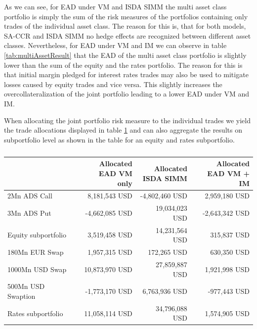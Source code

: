 \documentclass[../Thesis_AHoecherl.tex]{subfiles}
\begin{document}
    As we can see, for EAD under VM and ISDA SIMM the multi asset class portfolio is simply the sum of the risk measures of the portfolios containing only trades of the individual asset class.
    The reason for this is, that for both models, SA-CCR and ISDA SIMM no hedge effects are recognized between different asset classes.
    Nevertheless, for EAD under VM and IM we can observe in table \ref{tab:multiAssetResult} that the EAD of the multi asset class portfolio is slightly lower than the sum of the equity and the rates portfolio. 
    The reason for this is that initial margin pledged for interest rates trades may also be used to mitigate losses caused by equity trades and vice versa. This slightly increases the overcollateralization of the joint portfolio leading to a lower EAD under VM and IM.

    When allocating the joint portfolio risk measure to the individual trades we yield the trade allocations displayed in table \ref{tab:multiAssetAllocation} and can also aggregate the results on subportfolio level as shown in the table for an equity and rates subportfolio.

    \begin{table}[htbp]
        \centering
        \begin{tabular}{l||r|r|r}
                & \makecell{Allocated \\ EAD VM only} &\makecell{Allocated \\ ISDA SIMM} & \makecell{Allocated \\EAD VM + IM} \\
                \toprule
        2Mn ADS Call & 8,181,543 USD & -4,802,460 USD & 2,959,180 USD \\
        3Mn ADS Put & -4,662,085 USD & 19,034,023 USD & -2,643,342 USD \\
        \midrule
        Equity subportfolio & 3,519,458 USD & 14,231,564 USD & 315,837 USD \\
        \toprule
        180Mn EUR Swap & 1,957,315 USD & 172,265 USD & 630,350 USD \\
        1000Mn USD Swap & 10,873,970 USD & 27,859,887 USD & 1,921,998 USD \\
        500Mn USD Swaption & -1,773,170 USD & 6,763,936 USD & -977,443 USD \\
        \midrule
        Rates subportfolio & 11,058,114 USD & 34,796,088 USD & 1,574,905 USD \\
        \end{tabular}%
        \caption{}
        \label{tab:multiAssetAllocation}%
    \end{table}%
\end{document}
